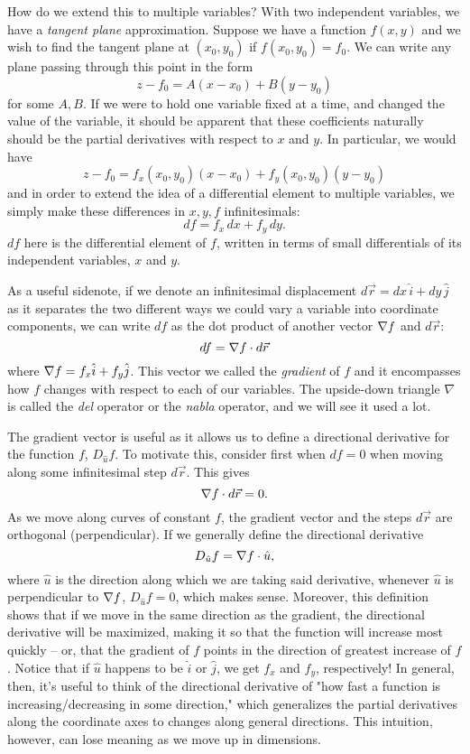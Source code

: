 How do we extend this to multiple variables? With two independent variables, we have a \textit{tangent plane} approximation. Suppose we have a function $f(x, y)$ and we wish to find the tangent plane at $(x_0, y_0)$ if $f(x_0, y_0) = f_0$. We can write any plane passing through this point in the form 
\[
	z - f_0 = A(x - x_0) + B(y - y_0)
\]
for some $A, B$. If we were to hold one variable fixed at a time, and changed the value of the variable, it should be apparent that these coefficients naturally should be the partial derivatives with respect to $x$ and $y$. In particular, we would have 
\[
	z - f_0 = f_x(x_0, y_0)(x - x_0) + f_y(x_0, y_0)(y-y_0)
\]
and in order to extend the idea of a differential element to multiple variables, we simply make these differences in $x, y, f$ infinitesimals:
\[
	df = f_x \, dx + f_y \, dy.
\]
$df$ here is the differential element of $f$, written in terms of small differentials of its independent variables, $x$ and $y$. 

As a useful sidenote, if we denote an infinitesimal displacement $d\vec{r} = dx \, \hat i + dy \, \hat j$ as it separates the two different ways we could vary a variable into coordinate components, we can write $df$ as the dot product of another vector $\nabla f$ and $d\vec{r}$: 
\[
	df = \nabla f \cdot d\vec{r}
\]	
where $\nabla f = f_x \hat i + f_y \hat j$. This vector we called the \textit{gradient} of $f$ and it encompasses how $f$ changes with respect to each of our variables. The upside-down triangle $\nabla$ is called the \textit{del} operator or the \textit{nabla} operator, and we will see it used a lot. 

The gradient vector is useful as it allows us to define a directional derivative for the function $f$, $D_{\hat u}f$. To motivate this, consider first when $df = 0$ when moving along some infinitesimal step $d\vec{r}$. This gives 
\[
	\nabla f \cdot d\vec{r} = 0.
\]
As we move along curves of constant $f$, the gradient vector and the steps $d\vec{r}$ are orthogonal (perpendicular). If we generally define the directional derivative 
\[
	D_{\hat u}f = \nabla f \cdot \hat u,
\]
where $\hat u$ is the direction along which we are taking said derivative, whenever $\hat u$ is perpendicular to $\nabla f$, $D_{\hat u}f = 0$, which makes sense. Moreover, this definition shows that if we move in the same direction as the gradient, the directional derivative will be maximized, making it so that the function will increase most quickly -- or, that the gradient of $f$ points in the direction of greatest increase of $f$. Notice that if $\hat u$ happens to be $\hat i$ or $\hat j$, we get $f_x$ and $f_y$, respectively! In general, then, it's useful to think of the directional derivative of "how fast a function is increasing/decreasing in some direction," which generalizes the partial derivatives along the coordinate axes to changes along general directions. This intuition, however, can lose meaning as we move up in dimensions. 

